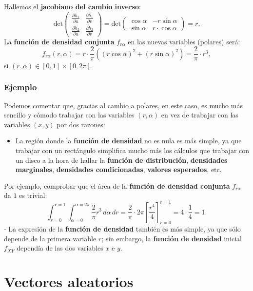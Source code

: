 \documentclass[]{book}
\providecommand{\tightlist}{%
  \setlength{\itemsep}{0pt}\setlength{\parskip}{0pt}}
\begin{document}
Hallemos el \textbf{jacobiano del cambio inverso}:
\[
\mathrm{det}\begin{pmatrix}\frac{\partial h_1}{\partial u} & \frac{\partial h_1}{\partial v}\\ \frac{\partial h_2}{\partial u} & \frac{\partial h_2}{\partial v}\end{pmatrix} =\mathrm{det}\begin{pmatrix}\cos\alpha & -r\sin\alpha\\ \sin\alpha & r\cdot\cos\alpha\end{pmatrix} = r.
\]
La \textbf{función de densidad conjunta} \(f_{r\alpha}\) en las nuevas variables (polares) será:
\[
f_{r\alpha}(r,\alpha)=r\cdot \frac{2}{\pi}\left((r\cos\alpha)^2+(r\sin\alpha)^2\right)=\frac{2}{\pi}\cdot r^3,
\]
si \((r,\alpha)\in [0,1]\times [0,2\pi]\).

\hypertarget{ejemplo-81}{%
\subsection{Ejemplo}\label{ejemplo-81}}

Podemos comentar que, gracias al cambio a polares, en este caso, es mucho más sencillo y cómodo trabajar con las variables \((r,\alpha)\) en vez de trabajar con las variables \((x,y)\) por dos razones:

\begin{itemize}
\tightlist
\item
  La región donde la \textbf{función de densidad} no es nula es más simple, ya que trabajar con un rectángulo simplifica mucho más los cálculos que trabajar con un disco a la hora de hallar la \textbf{función de distribución}, \textbf{densidades marginales}, \textbf{densidades condicionadas}, \textbf{valores esperados}, etc.
\end{itemize}

Por ejemplo, comprobar que el área de la \textbf{función de densidad conjunta} \(f_{r\alpha}\) da \(1\) es trivial:
\[
\int_{r=0}^{r=1}\int_{\alpha =0}^{\alpha =2\pi}\frac{2}{\pi} r^3\, d\alpha\, dr = \frac{2}{\pi}\cdot 2\pi \left[\frac{r^4}{4}\right]_{r=0}^{r=1}=4\cdot \frac{1}{4}=1.
\]
- La expresión de la \textbf{función de densidad} también es más simple, ya que sólo depende de la primera variable \(r\); sin embargo, la \textbf{función de densidad} inicial \(f_{XY}\) dependía de las dos variables \(x\) e \(y\).

\hypertarget{vectores-aleatorios}{%
\chapter{Vectores aleatorios}\label{vectores-aleatorios}}
\end{document}
